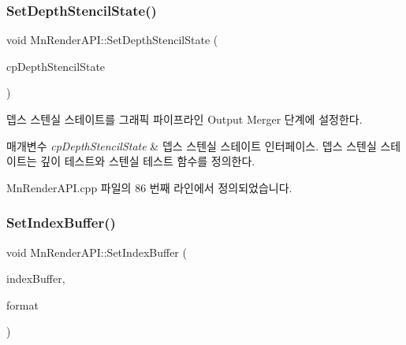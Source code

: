 \mbox{\label{class_m_n_l_1_1_mn_render_a_p_i_a4780504d046ae21574324f55d9799ea3}} 
\subsubsection{\texorpdfstring{Set\+Depth\+Stencil\+State()}{SetDepthStencilState()}}
{\footnotesize\ttfamily void Mn\+Render\+A\+P\+I\+::\+Set\+Depth\+Stencil\+State (\begin{DoxyParamCaption}\item[{const \hyperlink{namespace_m_n_l_a8209b06065c025e5d6bc2e8ee5925faf}{C\+P\+D3\+D\+Depth\+Stencil\+State} \&}]{cp\+Depth\+Stencil\+State }\end{DoxyParamCaption})}



뎁스 스텐실 스테이트를 그래픽 파이프라인 Output Merger 단계에 설정한다. 


\begin{DoxyParams}{매개변수}
{\em cp\+Depth\+Stencil\+State} & 뎁스 스텐실 스테이트 인터페이스.  뎁스 스텐실 스테이트는 깊이 테스트와 스텐실 테스트 함수를 정의한다. \\
\hline
\end{DoxyParams}


Mn\+Render\+A\+P\+I.\+cpp 파일의 86 번째 라인에서 정의되었습니다.

\mbox{\label{class_m_n_l_1_1_mn_render_a_p_i_a0879f9c1a226921f157e17a308c49840}} 
\subsubsection{\texorpdfstring{Set\+Index\+Buffer()}{SetIndexBuffer()}\hspace{0.1cm}{\footnotesize\ttfamily [1/2]}}
{\footnotesize\ttfamily void Mn\+Render\+A\+P\+I\+::\+Set\+Index\+Buffer (\begin{DoxyParamCaption}\item[{const \hyperlink{namespace_m_n_l_aab9c90a8c27ac6410a9cc7cd89efeef1}{C\+P\+D3\+D\+Buffer} \&}]{index\+Buffer,  }\item[{D\+X\+G\+I\+\_\+\+F\+O\+R\+M\+AT}]{format }\end{DoxyParamCaption})}



